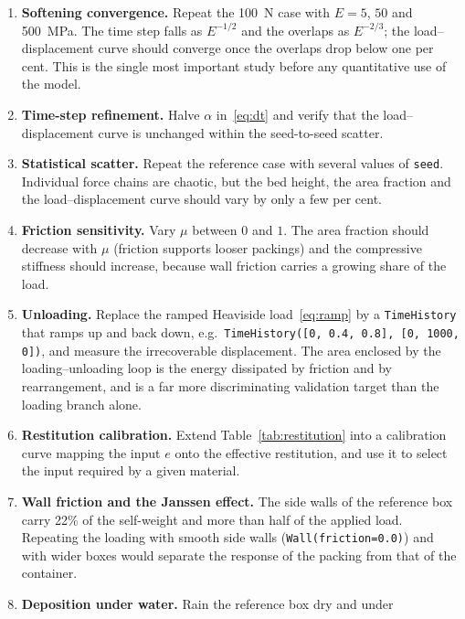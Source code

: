 \begin{enumerate}[leftmargin=2.2em]
  \item \textbf{Softening convergence.}  Repeat the \qty{100}{\newton} case with
        $E=5$, $50$ and \qty{500}{\mega\pascal}.  The time step falls as
        $E^{-1/2}$ and the overlaps as $E^{-2/3}$; the load--displacement curve
        should converge once the overlaps drop below one per cent.  This is the
        single most important study before any quantitative use of the model.
  \item \textbf{Time-step refinement.}  Halve $\alpha$ in~\eqref{eq:dt} and
        verify that the load--displacement curve is unchanged within the
        seed-to-seed scatter.
  \item \textbf{Statistical scatter.}  Repeat the reference case with several
        values of \texttt{seed}.  Individual force chains are chaotic, but the
        bed height, the area fraction and the load--displacement curve should
        vary by only a few per cent.
  \item \textbf{Friction sensitivity.}  Vary $\mu$ between $0$ and $1$.  The
        area fraction should decrease with $\mu$ (friction supports looser
        packings) and the compressive stiffness should increase, because wall
        friction carries a growing share of the load.
  \item \textbf{Unloading.}  Replace the ramped Heaviside
        load~\eqref{eq:ramp} by a \texttt{TimeHistory} that ramps up and back
        down, e.g.\ \texttt{TimeHistory([0, 0.4, 0.8], [0, 1000, 0])}, and
        measure the irrecoverable displacement.  The area enclosed by
        the loading--unloading loop is the energy dissipated by friction and by
        rearrangement, and is a far more discriminating validation target than
        the loading branch alone.
  \item \textbf{Restitution calibration.}  Extend Table~\ref{tab:restitution}
        into a calibration curve mapping the input $e$ onto the effective
        restitution, and use it to select the input required by a given
        material.
  \item \textbf{Wall friction and the Janssen effect.}  The side walls of the
        reference box carry \num{22}\% of the self-weight and more than half of
        the applied load.  Repeating the loading with smooth side walls
        (\texttt{Wall(friction=0.0)}) and with wider boxes would separate the
        response of the packing from that of the container.
  \item \textbf{Deposition under water.}  Rain the reference box dry and under

\end{enumerate}
